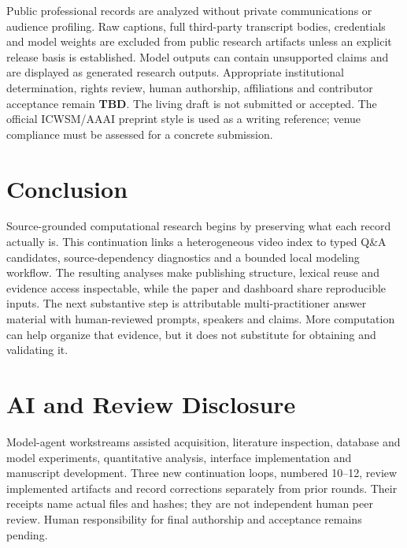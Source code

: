 Public professional records are analyzed without private communications or audience profiling. Raw captions, full third-party transcript bodies, credentials and model weights are excluded from public research artifacts unless an explicit release basis is established. Model outputs can contain unsupported claims and are displayed as generated research outputs. Appropriate institutional determination, rights review, human authorship, affiliations and contributor acceptance remain \textbf{TBD}. The living draft is not submitted or accepted. The official ICWSM/AAAI preprint style is used as a writing reference; venue compliance must be assessed for a concrete submission.

\section{Conclusion}
Source-grounded computational research begins by preserving what each record actually is. This continuation links a heterogeneous video index to typed Q\&A candidates, source-dependency diagnostics and a bounded local modeling workflow. The resulting analyses make publishing structure, lexical reuse and evidence access inspectable, while the paper and dashboard share reproducible inputs. The next substantive step is attributable multi-practitioner answer material with human-reviewed prompts, speakers and claims. More computation can help organize that evidence, but it does not substitute for obtaining and validating it.

\section*{AI and Review Disclosure}
Model-agent workstreams assisted acquisition, literature inspection, database and model experiments, quantitative analysis, interface implementation and manuscript development. Three new continuation loops, numbered 10--12, review implemented artifacts and record corrections separately from prior rounds. Their receipts name actual files and hashes; they are not independent human peer review. Human responsibility for final authorship and acceptance remains pending.
